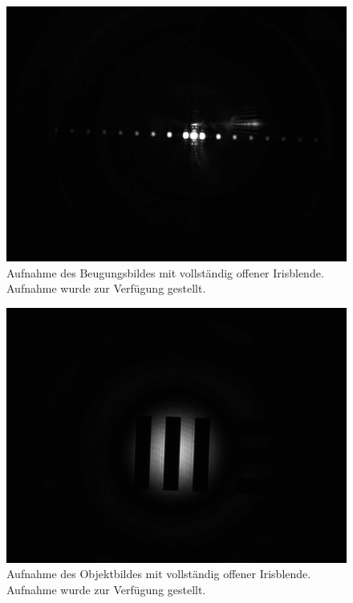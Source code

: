 \documentclass{article}
\begin{document}
\begin{minipage}[t]{.45\textwidth}
\begin{figure}[H]
\includegraphics[scale=0.1]{jw/L_BB_1.jpg}
\caption{Aufnahme des Beugungsbildes mit vollständig offener Irisblende. Aufnahme wurde zur Verfügung gestellt.}
\label{fig:bbild_voll_jw}
\end{figure}
\end{minipage}
\hfill
\noindent
\begin{minipage}[t]{.45\textwidth}
\begin{figure}[H]
\includegraphics[scale=0.1]{jw/L_OB_1.jpg}
\caption{Aufnahme des Objektbildes mit vollständig offener Irisblende. Aufnahme wurde zur Verfügung gestellt.}\label{fig:bild_voll_jw}
\end{figure}
\end{minipage}
\end{document}

